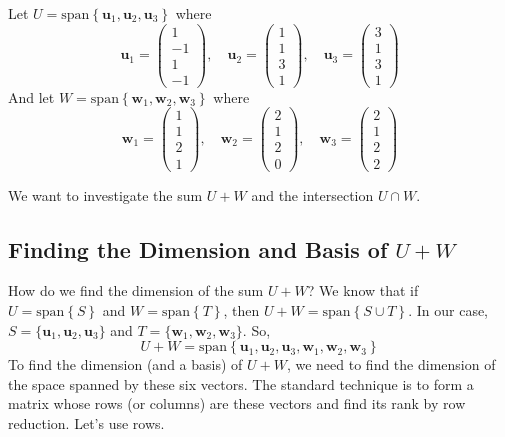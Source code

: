 \documentclass[11pt]{article}
\theoremstyle{definition}
\theoremstyle{remark}
\newcommand{\vsspan}[1]{\text{span}\left\{#1\right\}}
\newcommand{\vecu}{\mathbf{u}}
\newcommand{\vecw}{\mathbf{w}}
\begin{document}
Let $U = \vsspan{\vecu_1, \vecu_2, \vecu_3}$ where
\[ \vecu_1 = \begin{pmatrix} 1 \\ -1 \\ 1 \\ -1 \end{pmatrix}, \quad \vecu_2 = \begin{pmatrix} 1 \\ 1 \\ 3 \\ 1 \end{pmatrix}, \quad \vecu_3 = \begin{pmatrix} 3 \\ 1 \\ 3 \\ 1 \end{pmatrix} \]
And let $W = \vsspan{\vecw_1, \vecw_2, \vecw_3}$ where
\[ \vecw_1 = \begin{pmatrix} 1 \\ 1 \\ 2 \\ 1 \end{pmatrix}, \quad \vecw_2 = \begin{pmatrix} 2 \\ 1 \\ 2 \\ 0 \end{pmatrix}, \quad \vecw_3 = \begin{pmatrix} 2 \\ 1 \\ 2 \\ 2 \end{pmatrix} \]

We want to investigate the sum $U+W$ and the intersection $U \cap W$.

\subsection{Finding the Dimension and Basis of $U+W$}

How do we find the dimension of the sum $U+W$? We know that if $U = \vsspan{S}$ and $W = \vsspan{T}$, then $U+W = \vsspan{S \cup T}$. In our case, $S = \{\vecu_1, \vecu_2, \vecu_3\}$ and $T = \{\vecw_1, \vecw_2, \vecw_3\}$. So,
\[ U+W = \vsspan{\vecu_1, \vecu_2, \vecu_3, \vecw_1, \vecw_2, \vecw_3} \]
To find the dimension (and a basis) of $U+W$, we need to find the dimension of the space spanned by these six vectors. The standard technique is to form a matrix whose rows (or columns) are these vectors and find its rank by row reduction. Let's use rows.
\end{document}
